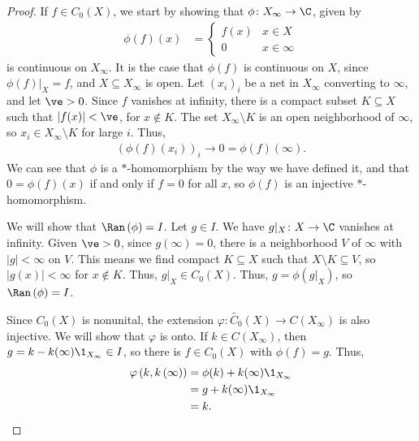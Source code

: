 \documentclass[10pt]{mypackage}
\begin{document}
\begin{proof}
  If $f\in C_0\left(X\right)$, we start by showing that $\phi\colon X_{\infty} \rightarrow \C$, given by
  \begin{align*}
    \phi\left(f\right)\left(x\right) &= \begin{cases}
      f(x) & x\in X\\
      0 & x\in\infty
    \end{cases}
  \end{align*}
  is continuous on $X_{\infty}$. It is the case that $\phi(f)$ is continuous on $X$, since $\phi(f)|_{X} = f$, and $X\subseteq X_{\infty}$ is open. Let $\left(x_i\right)_i$ be a net in $X_{\infty}$ converting to $\infty$, and let $\ve > 0$. Since $f$ vanishes at infinity, there is a compact subset $K\subseteq X$ such that $\left\vert f(x) \right\vert < \ve$, for $x\notin K$. The set $X_{\infty}\setminus K$ is an open neighborhood of $\infty$, so $x_i\in X_{\infty}\setminus K$ for large $i$. Thus,
  \begin{align*}
    \left(\phi(f)\left(x_i\right)\right)_{i}\rightarrow 0 = \phi(f)(\infty).
  \end{align*}
  We can see that $\phi$ is a $\ast$-homomorphism by the way we have defined it, and that $0 = \phi(f)(x)$ if and only if $f = 0$ for all $x$, so $\phi(f)$ is an injective $\ast$-homomorphism.\newline

  We will show that $\Ran\left(\phi\right) = I$. Let $g\in I$. We have $g|_{X}\colon X\rightarrow \C$ vanishes at infinity. Given $\ve > 0$, since $g(\infty) = 0$, there is a neighborhood $V$ of $\infty$ with $\left\vert g \right\vert < \infty$ on $V$. This means we find compact $K\subseteq X$ such that $X\setminus K \subseteq V$, so $\left\vert g(x) \right\vert < \infty$ for $x\notin K$. Thus, $g|_{X} \in C_0\left(X\right)$. Thus, $g = \phi\left(g|_{X}\right)$, so $\Ran\left(\phi\right) = I$.\newline

  Since $C_0\left(X\right)$ is nonunital, the extension $\varphi\colon \widetilde{C_0}\left(X\right) \rightarrow C\left(X_{\infty}\right)$ is also injective. We will show that $\varphi$ is onto. If $k\in C\left(X_{\infty}\right)$, then $g = k - k(\infty)\1_{X_{\infty}}\in I$, so there is $f\in C_0\left(X\right)$ with $\phi(f) = g$. Thus,
  \begin{align*}
    \varphi\left(k,k\left(\infty\right)\right) &= \phi(k) + k(\infty)\1_{X_{\infty}}\\
                                               &= g + k(\infty)\1_{X_{\infty}}\\
                                               &= k.
  \end{align*}
\end{proof}
\end{document}
